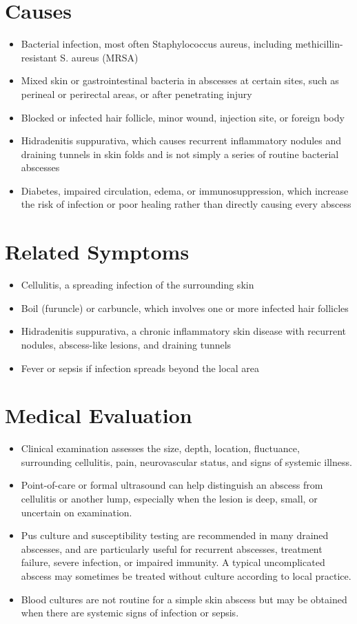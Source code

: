 \section*{Causes}
\begin{itemize}
\item Bacterial infection, most often Staphylococcus aureus, including methicillin-resistant S. aureus (MRSA)
\item Mixed skin or gastrointestinal bacteria in abscesses at certain sites, such as perineal or perirectal areas, or after penetrating injury
\item Blocked or infected hair follicle, minor wound, injection site, or foreign body
\item Hidradenitis suppurativa, which causes recurrent inflammatory nodules and draining tunnels in skin folds and is not simply a series of routine bacterial abscesses
\item Diabetes, impaired circulation, edema, or immunosuppression, which increase the risk of infection or poor healing rather than directly causing every abscess
\end{itemize}

\section*{Related Symptoms}
\begin{itemize}
\item Cellulitis, a spreading infection of the surrounding skin
\item Boil (furuncle) or carbuncle, which involves one or more infected hair follicles
\item Hidradenitis suppurativa, a chronic inflammatory skin disease with recurrent nodules, abscess-like lesions, and draining tunnels
\item Fever or sepsis if infection spreads beyond the local area
\end{itemize}

\section*{Medical Evaluation}
\begin{itemize}
\item Clinical examination assesses the size, depth, location, fluctuance, surrounding cellulitis, pain, neurovascular status, and signs of systemic illness.
\item Point-of-care or formal ultrasound can help distinguish an abscess from cellulitis or another lump, especially when the lesion is deep, small, or uncertain on examination.
\item Pus culture and susceptibility testing are recommended in many drained abscesses, and are particularly useful for recurrent abscesses, treatment failure, severe infection, or impaired immunity. A typical uncomplicated abscess may sometimes be treated without culture according to local practice.
\item Blood cultures are not routine for a simple skin abscess but may be obtained when there are systemic signs of infection or sepsis.
\end{itemize}

